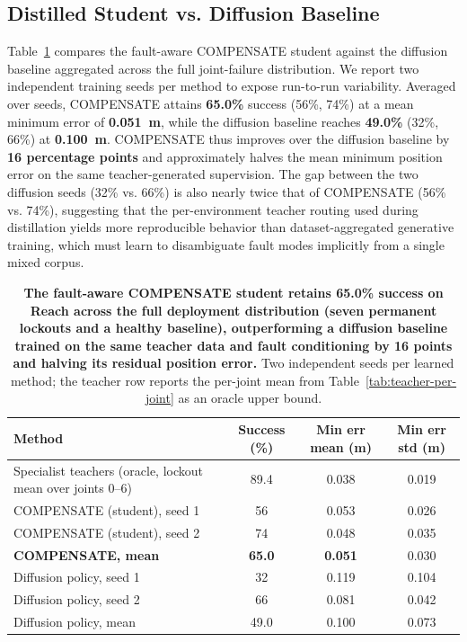 \documentclass{article}
\begin{document}
	\subsection{Distilled Student vs. Diffusion Baseline}
	\label{subsec:results-student}

		Table~\ref{tab:agg} compares the fault-aware COMPENSATE student against the
		diffusion baseline aggregated across the full joint-failure distribution.
		We report two independent training seeds per method to expose run-to-run
		variability. Averaged over seeds, COMPENSATE attains \textbf{65.0\%} success
		(56\%, 74\%) at a mean minimum error of \textbf{0.051~m}, while the
		diffusion baseline reaches \textbf{49.0\%} (32\%, 66\%) at \textbf{0.100~m}.
		COMPENSATE thus improves over the diffusion baseline by \textbf{16
		percentage points} and approximately halves the mean minimum
		position error on the same teacher-generated supervision. The gap between
		the two diffusion seeds (32\% vs. 66\%) is also nearly twice that of
		COMPENSATE (56\% vs. 74\%), suggesting that the per-environment teacher
		routing used during distillation yields more reproducible behavior than
		dataset-aggregated generative training, which must learn to disambiguate
		fault modes implicitly from a single mixed corpus.

		\begin{table}[t]
		\centering
		\small
		\caption{\textbf{The fault-aware COMPENSATE student retains 65.0\% success on Reach across
		the full deployment distribution (seven permanent lockouts and a healthy baseline),
		outperforming a diffusion baseline trained on the same teacher data and fault conditioning
		by 16 points and halving its residual position error.}
		Two independent seeds per learned method; the teacher row reports the per-joint mean from
		Table~\ref{tab:teacher-per-joint} as an oracle upper bound.}
		\label{tab:agg}
		\begin{tabular}{lccc}
		\toprule
		Method & Success (\%) & Min err mean (m) & Min err std (m) \\
		\midrule
		Specialist teachers (oracle, lockout mean over joints 0--6) & 89.4          & 0.038         & 0.019 \\
		\midrule
		COMPENSATE (student), seed 1                 & 56            & 0.053         & 0.026 \\
		COMPENSATE (student), seed 2                 & 74            & 0.048         & 0.035 \\
		\textbf{COMPENSATE, mean}                    & \textbf{65.0} & \textbf{0.051} & 0.030 \\
		\midrule
		Diffusion policy, seed 1                     & 32            & 0.119         & 0.104 \\
		Diffusion policy, seed 2                     & 66            & 0.081         & 0.042 \\
		Diffusion policy, mean                       & 49.0          & 0.100         & 0.073 \\
		\bottomrule
		\end{tabular}
		\end{table}
\end{document}
